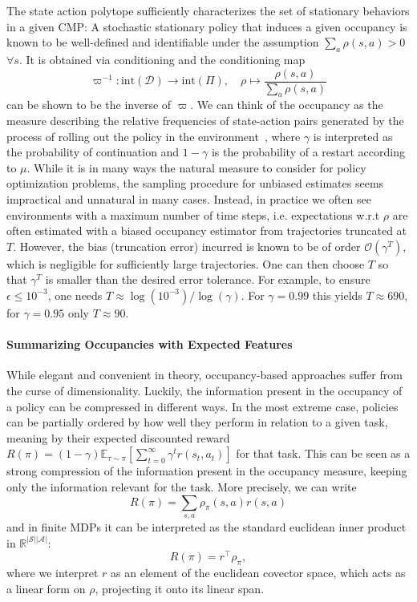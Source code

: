 \documentclass{article}
\theoremstyle{plain}
\theoremstyle{definition}
\theoremstyle{remark}
\newcommand{\sS}{\mathcal{S}}
\newcommand{\sA}{\mathcal{A}}
\newcommand{\p}{\rho}  %
\newcommand{\cD}{\mathcal{D}}
\begin{document}
The state action polytope sufficiently characterizes the set of stationary behaviors in a given CMP: A stochastic stationary policy that induces a given occupancy is known to be well-defined and identifiable under the assumption $\sum_a \p(s,a)>0$  $\forall s$. It is obtained via conditioning and the conditioning map
\begin{equation}
    \varpi^{-1}:\mathrm{int}(\cD)\to\mathrm{int}(\Pi), \quad \p\mapsto\frac{\p(s,a)}{\sum_{a}\p(s,a)}
\end{equation}
can be shown to be the inverse of $\varpi$.
We can think of the occupancy as the measure describing the relative frequencies of state-action pairs generated by the process of rolling out the policy in the environment~\citep{agarwal2021theory}, where $\gamma$ is interpreted as the probability of continuation and $1-\gamma$ is the probability of a restart according to $\mu$. 
While it is in many ways the natural measure to consider for policy optimization problems, the sampling procedure for unbiased estimates seems impractical and unnatural in many cases. Instead, in practice we often see environments with a maximum number of time steps, i.e. expectations w.r.t $\rho$ are often estimated with a biased occupancy estimator from trajectories truncated at $T$. However, the bias (truncation error) incurred is known to be of order $\mathcal{O}(\gamma^T)$, which is negligible for sufficiently large trajectories. One can then choose $T$ so that $\gamma^T$ is smaller than the desired error tolerance. For example, to ensure $\epsilon \le 10^{-3}$, one needs $T \approx \log(10^{-3})/\log(\gamma)$. For $\gamma=0.99$ this yields $T \approx 690$, for $\gamma=0.95$ only $T \approx 90$.

\paragraph{Summarizing Occupancies with Expected Features}
While elegant and convenient in theory, occupancy-based approaches suffer from the curse of dimensionality. Luckily, the information present in the occupancy of a policy can be compressed in different ways. In the most extreme case, policies can be partially ordered by how well they perform in relation to a given task, meaning by their expected discounted reward $R(\pi) = (1-\gamma)\mathbb{E}_{\tau\sim\pi}[\sum_{t=0}^{\infty} \gamma^t r(s_t, a_t)]$ for that task. This can be seen as a strong compression of the information present in the occupancy measure, keeping only the information relevant for the task. More precisely, we can write
$$
    R(\pi) = \sum_{s,a}\rho_\pi(s,a)r(s,a)
$$
and in finite MDPs it can be interpreted as the standard euclidean inner product in $\mathbb{R}^{|\sS||\sA|}$:
$$
    R(\pi) = r^\top \rho_\pi,
$$
where we interpret $r$ as an element of the euclidean covector space, which acts as a linear form on $\rho$, projecting it onto its linear span.
\end{document}
